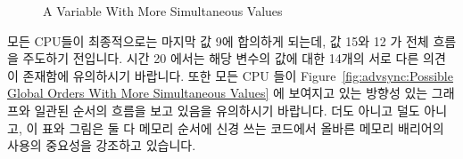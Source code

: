 \begin{figure}
\centering
{}
\caption{A Variable With More Simultaneous Values}
\end{figure}

모든 CPU들이 최종적으로는 마지막 값 9에 합의하게 되는데, 값 15와 12 가 전체
흐름을 주도하기 전입니다.
시간 20 에서는 해당 변수의 값에 대한 14개의 서로 다른 의견이 존재함에
유의하시기 바랍니다.
또한 모든 CPU 들이
Figure~\ref{fig:advsync:Possible Global Orders With More Simultaneous Values}
에 보여지고 있는 방향성 있는 그래프와 일관된 순서의 흐름을 보고 있음을
유의하시기 바랍니다.
더도 아니고 덜도 아니고, 이 표와 그림은 둘 다 메모리 순서에 신경 쓰는 코드에서
올바른 메모리 배리어의 사용의 중요성을 강조하고 있습니다.
\iffalse


